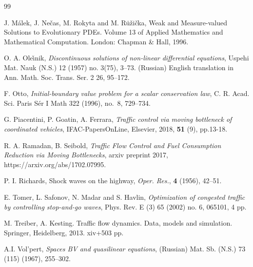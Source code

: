 \documentclass[a4paper, 10pt, final]{article}
\begin{document}
\begin{thebibliography}{99}
 
%    

 J. M\'alek, J. Ne\v{c}as, M. Rokyta and M. R\.{u}\v{z}i\v{c}ka, Weak and Measure-valued Solutions to Evolutionary PDEs.
Volume 13 of Applied Mathematics and Mathematical Computation. London: Chapman \& Hall, 1996.


 O. A. Ole\v{\i}nik, \textsl{Discontinuous solutions of non-linear differential equations}, Uspehi Mat. Nauk (N.S.) 12 (1957) no. 3(75), 3--73. (Russian) English translation in Ann. Math. Soc. Trans. Ser. 2 26, 95--172.


 F. Otto, \textsl{Initial-boundary value problem for a scalar conservation law},
 C. R. Acad. Sci. Paris S\'er I Math 322 (1996), no.~8, 729--734.


G.  Piacentini, P. Goatin, A. Ferrara, \textsl{Traffic control via moving bottleneck of coordinated vehicles}, IFAC-PapersOnLine, Elsevier, 2018, \textbf{51} (9), pp.13-18.  

 R. A. Ramadan, B.  Seibold, \textsl{
Traffic Flow Control and Fuel Consumption Reduction via Moving Bottlenecks}, arxiv preprint 2017, https://arxiv.org/abs/1702.07995.


  P. I. Richards, Shock waves on the highway, \textsl{Oper. Res.}, \textbf{4} (1956), 42--51.

 E. Tomer, L. Safonov, N. Madar and S. Havlin, \textsl{Optimization of congested traffic by controlling stop-and-go waves}, Phys. Rev. E (3) 65 (2002)  no. 6, 065101, 4 pp. 


 M. Treiber, A. Kesting. Traffic flow dynamics. Data, models and simulation. Springer, Heidelberg, 2013. xiv+503 pp.

 A.I. Vol'pert, \textsl{Spaces BV and quasilinear equations}, (Russian)
  Mat. Sb. (N.S.)  73 (115) (1967), 255--302.

    
\end{thebibliography}
\end{document}
